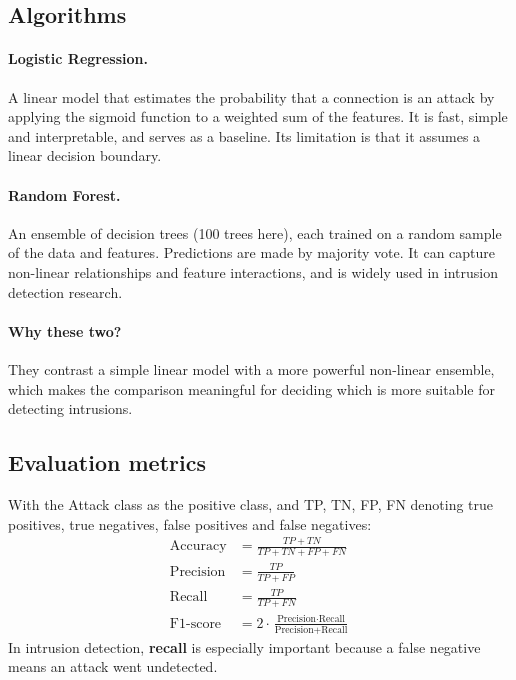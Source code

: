\documentclass[12pt,a4paper]{article}
\begin{document}
\subsection{Algorithms}
\paragraph{Logistic Regression.}
A linear model that estimates the probability that a connection is an attack
by applying the sigmoid function to a weighted sum of the features. It is fast,
simple and interpretable, and serves as a baseline. Its limitation is that it
assumes a linear decision boundary.

\paragraph{Random Forest.}
An ensemble of decision trees (100 trees here), each trained on a random
sample of the data and features. Predictions are made by majority vote. It can
capture non-linear relationships and feature interactions, and is widely used
in intrusion detection research.

\paragraph{Why these two?}
They contrast a simple linear model with a more powerful non-linear ensemble,
which makes the comparison meaningful for deciding which is more suitable for
detecting intrusions.

\subsection{Evaluation metrics}
With the Attack class as the positive class, and TP, TN, FP, FN denoting true
positives, true negatives, false positives and false negatives:
\begin{align}
  \text{Accuracy}  &= \frac{TP + TN}{TP + TN + FP + FN} \\[4pt]
  \text{Precision} &= \frac{TP}{TP + FP} \\[4pt]
  \text{Recall}    &= \frac{TP}{TP + FN} \\[4pt]
  \text{F1-score}  &= 2 \cdot \frac{\text{Precision} \cdot \text{Recall}}{\text{Precision} + \text{Recall}}
\end{align}
In intrusion detection, \textbf{recall} is especially important because a false
negative means an attack went undetected.

\end{document}
